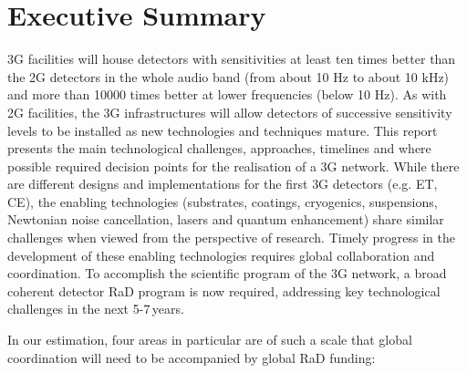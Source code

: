 \chapter{Executive Summary}
\label{sec:ExecSummary}
\renewcommand{\thepage}{ES\roman{page}}
\Ac{3G} facilities will house detectors with sensitivities at least ten times better than the \ac{2G} detectors in the whole audio band (from about 10 Hz to about 10 kHz) and more than 10000 times better at lower frequencies (below 10 Hz).
As with \ac{2G} facilities, the \ac{3G} infrastructures will allow detectors of successive sensitivity levels  %
to be installed as new technologies and techniques mature.  This report presents the main technological challenges, approaches, timelines and where possible required decision points for the realisation of a \ac{3G} network. While there are different designs and implementations for the first \ac{3G} detectors (e.g. \ac{ET}, \ac{CE}), the enabling technologies (substrates, coatings, cryogenics, suspensions, Newtonian noise cancellation, lasers and quantum enhancement) share similar challenges when viewed from the perspective of research.  Timely progress in the development of these enabling technologies requires global collaboration and coordination. To accomplish the scientific program of the 3G network, a broad coherent detector \ac{RaD} program is now required, addressing key technological challenges in the next 5-7\,years.

In our estimation, four areas in particular are of such a scale that global coordination will need to be accompanied by global \ac{RaD} funding: 

